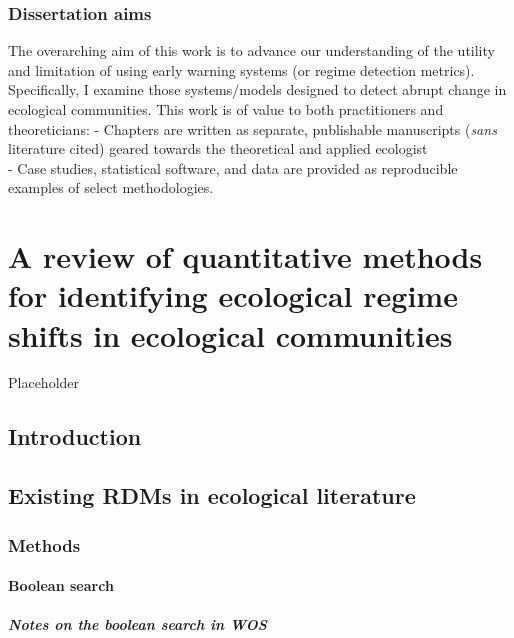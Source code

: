 \documentclass[12pt,twoside]{reedthesis}
\begin{document}
\hypertarget{dissertation-aims}{%
\subsection{Dissertation aims}\label{dissertation-aims}}

The overarching aim of this work is to advance our understanding of the utility and limitation of using early warning systems (or regime detection metrics). Specifically, I examine those systems/models designed to detect abrupt change in ecological communities. This work is of value to both practitioners and theoreticians:
- Chapters are written as separate, publishable manuscripts (\emph{sans} literature cited) geared towards the theoretical and applied ecologist\\
- Case studies, statistical software, and data are provided as reproducible examples of select methodologies.

\hypertarget{chapter-rdmMethodsReview}{%
\chapter{A review of quantitative methods for identifying ecological regime shifts in ecological communities}\label{chapter-rdmMethodsReview}}

Placeholder

\hypertarget{introduction}{%
\section{Introduction}\label{introduction}}

\hypertarget{existing-rdms-in-ecological-literature}{%
\section{Existing RDMs in ecological literature}\label{existing-rdms-in-ecological-literature}}

\hypertarget{methods}{%
\subsection{Methods}\label{methods}}

\hypertarget{boolean-search}{%
\subsubsection{Boolean search}\label{boolean-search}}

\hypertarget{notes-on-the-boolean-search-in-wos}{%
\paragraph{Notes on the boolean search in WOS}\label{notes-on-the-boolean-search-in-wos}}
\end{document}
